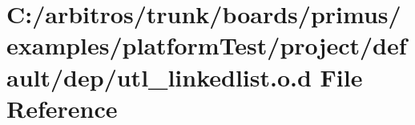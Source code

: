 \hypertarget{platform_test_2project_2default_2dep_2utl__linkedlist_8o_8d}{\section{C\-:/arbitros/trunk/boards/primus/examples/platform\-Test/project/default/dep/utl\-\_\-linkedlist.o.\-d File Reference}
\label{platform_test_2project_2default_2dep_2utl__linkedlist_8o_8d}
}
